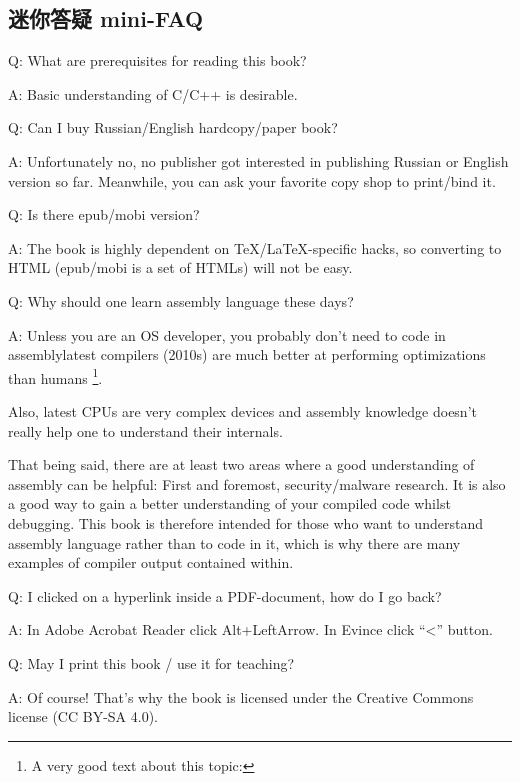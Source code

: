 \documentclass[UTF8,nofonts]{ctexart}
\begin{document}

\subsection*{迷你答疑 mini-FAQ}

\par Q: What are prerequisites for reading this book?
\par A: Basic understanding of C/C++ is desirable.

\par Q: Can I buy Russian/English hardcopy/paper book?
\par A: Unfortunately no, no publisher got interested in publishing Russian or English version so far.
Meanwhile, you can ask your favorite copy shop to print/bind it.

\par Q: Is there epub/mobi version?
\par A: The book is highly dependent on TeX/LaTeX-specific hacks, so converting to HTML (epub/mobi is a set of HTMLs)
will not be easy.

\par Q: Why should one learn assembly language these days?
\par A: Unless you are an \ac{OS} developer, you probably don't need to code in assembly\textemdash{}latest compilers (2010s) are much better at performing optimizations than humans \footnote{A very good text about this topic: \InSqBrackets{\AgnerFog}}.

Also, latest \ac{CPU}s are very complex devices and assembly knowledge doesn't really help one to understand their internals.

That being said, there are at least two areas where a good understanding of assembly can be helpful: 
First and foremost, security/malware research. It is also a good way to gain a better understanding of your compiled code whilst debugging.
This book is therefore intended for those who want to understand assembly language rather 
than to code in it, which is why there are many examples of compiler output contained within.

\par Q: I clicked on a hyperlink inside a PDF-document, how do I go back?
\par A: In Adobe Acrobat Reader click Alt+LeftArrow. In Evince click ``<'' button.

\par Q: May I print this book / use it for teaching?
\par A: Of course! That's why the book is licensed under the Creative Commons license (CC BY-SA 4.0).
\end{document}
